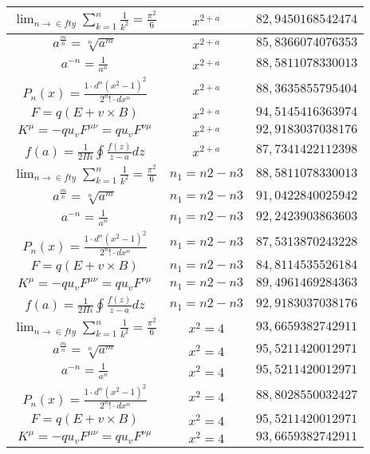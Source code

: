 \documentclass{article}
\begin{document}
\begin{flushleft}
\begin{longtable}{|c|c|c|}
$\lim_{n\to\in fty}\sum_{k=1}^n\frac{1}{k^2}=\frac{\pi^2}{6}$ & $x^{2+a}$ & $82,9450168542474$ \\ \hline 
$a^{\frac{m}{n}}=\sqrt[n]{a^{m}}$ & $x^{2+a}$ & $85,8366074076353$ \\ \hline 
$a^{-n}=\frac{1}{a^{n}}$ & $x^{2+a}$ & $88,5811078330013$ \\ \hline 
$P_n\left(x\right)=\frac{1\cdot d^n\left(x^2-1\right)^2}{2^n!\cdot dx^n}$ & $x^{2+a}$ & $88,3635855795404$ \\ \hline 
$F=q\left(E+v\times B\right)$ & $x^{2+a}$ & $94,5145416363974$ \\ \hline 
$K^\mu=-qu_vF^{\mu\nu}=qu_vF^{\nu\mu}$ & $x^{2+a}$ & $92,9183037038176$ \\ \hline 
$f\left(a\right)=\frac{1}{2\Pi i}\oint\frac{f\left(z\right)}{z-a}dz$ & $x^{2+a}$ & $87,7341422112398$ \\ \hline 
$\lim_{n\to\in fty}\sum_{k=1}^n\frac{1}{k^2}=\frac{\pi^2}{6}$ & $n_{1}={n{2}-n{3}}$ & $88,5811078330013$ \\ \hline 
$a^{\frac{m}{n}}=\sqrt[n]{a^{m}}$ & $n_{1}={n{2}-n{3}}$ & $91,0422840025942$ \\ \hline 
$a^{-n}=\frac{1}{a^{n}}$ & $n_{1}={n{2}-n{3}}$ & $92,2423903863603$ \\ \hline 
$P_n\left(x\right)=\frac{1\cdot d^n\left(x^2-1\right)^2}{2^n!\cdot dx^n}$ & $n_{1}={n{2}-n{3}}$ & $87,5313870243228$ \\ \hline 
$F=q\left(E+v\times B\right)$ & $n_{1}={n{2}-n{3}}$ & $84,8114535526184$ \\ \hline 
$K^\mu=-qu_vF^{\mu\nu}=qu_vF^{\nu\mu}$ & $n_{1}={n{2}-n{3}}$ & $89,4961469284363$ \\ \hline 
$f\left(a\right)=\frac{1}{2\Pi i}\oint\frac{f\left(z\right)}{z-a}dz$ & $n_{1}={n{2}-n{3}}$ & $92,9183037038176$ \\ \hline 
$\lim_{n\to\in fty}\sum_{k=1}^n\frac{1}{k^2}=\frac{\pi^2}{6}$ & $x^2=4$ & $93,6659382742911$ \\ \hline 
$a^{\frac{m}{n}}=\sqrt[n]{a^{m}}$ & $x^2=4$ & $95,5211420012971$ \\ \hline 
$a^{-n}=\frac{1}{a^{n}}$ & $x^2=4$ & $95,5211420012971$ \\ \hline 
$P_n\left(x\right)=\frac{1\cdot d^n\left(x^2-1\right)^2}{2^n!\cdot dx^n}$ & $x^2=4$ & $88,8028550032427$ \\ \hline 
$F=q\left(E+v\times B\right)$ & $x^2=4$ & $95,5211420012971$ \\ \hline 
$K^\mu=-qu_vF^{\mu\nu}=qu_vF^{\nu\mu}$ & $x^2=4$ & $93,6659382742911$ \\ \hline 

\end{longtable}
\end{flushleft}
\end{document}
